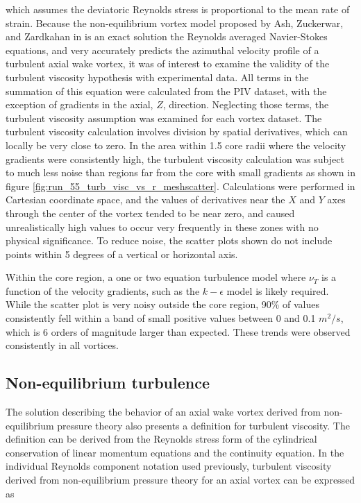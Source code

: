 \noindent
which assumes the deviatoric Reynolds stress is proportional to the mean rate 
of strain. Because the non-equilibrium vortex model proposed by Ash, Zuckerwar, 
and Zardkahan in \cite{ash2011} is an exact solution the Reynolds averaged 
Navier-Stokes equations, and very accurately predicts the azimuthal velocity 
profile of a turbulent axial wake vortex, it was of interest to examine the 
validity of 
the turbulent viscosity hypothesis with experimental data. All terms in the 
summation of this equation were calculated from the PIV dataset, with the 
exception of gradients in the axial, $Z$, direction. Neglecting those terms, 
the turbulent viscosity assumption was examined for each vortex dataset. The 
turbulent viscosity calculation involves division by spatial derivatives, which 
can locally be very close to zero. In the area within 1.5 core radii where the 
velocity gradients were consistently high, the turbulent viscosity calculation 
was subject to much less noise than regions far from the core with small 
gradients as shown in figure \ref{fig:run_55_turb_visc_vs_r_meshscatter}. 
Calculations were performed in Cartesian coordinate space, and the values 
of derivatives near the $X$ and $Y$ axes through the center of the vortex 
tended to be near zero, and caused unrealistically high values to occur very 
frequently in these zones with no physical significance. To reduce noise, the 
scatter plots shown do not include points within 5 degrees of a vertical or 
horizontal axis.



\noindent
Within the core region, a one or two equation turbulence model where $\nu_T$ is 
a function of the velocity gradients, such as the $k-\epsilon$ model is likely 
required. While the scatter plot is very noisy outside the core region, 
90\% of values consistently fell within a band of small positive values between 
0 and 0.1 $m^2/s$, which is 6 orders of magnitude larger than expected.
These trends were observed consistently in all vortices.

\subsection{Non-equilibrium turbulence}
The solution describing the behavior of an axial wake vortex derived from 
non-equilibrium pressure theory also presents a definition for turbulent 
viscosity. The definition can be derived from the Reynolds stress form of the 
cylindrical conservation of linear momentum equations and the continuity 
equation. In the individual Reynolds component notation used previously, 
turbulent viscosity derived from non-equilibrium pressure theory for an axial 
vortex can be expressed as

